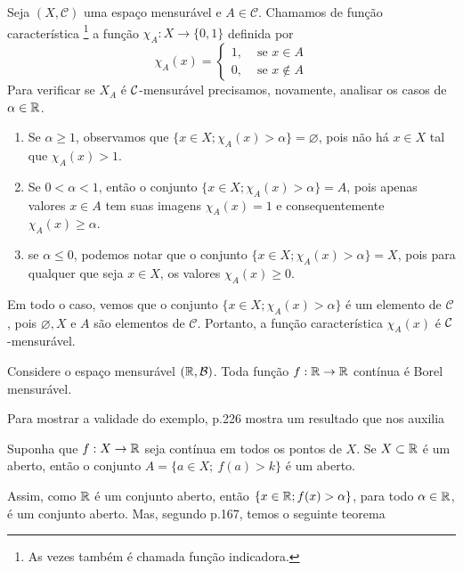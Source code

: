 \begin{example}
    Seja $(X, \mathcal{C})$ uma espaço mensurável e $A \in \mathcal{C}$.
    Chamamos de função característica \footnote{As vezes também é chamada  função indicadora.}
    a função $\chi_A: X \to \{0,1\}$ definida por 
    $$\chi_A(x) =\left\{\begin{array}{cc}
         1, & \textrm{\ se \ } x \in A \\
         0, & \textrm{\ se \ } x \notin A
    \end{array}\right.
    $$
	Para verificar se $X_A$ é $\operatorname{\mathcal{C}}$-mensurável precisamos, novamente, analisar os casos de $\alpha \in \mathbb{R}$.
	\begin{enumerate}[label*= (\Roman*)]
		\item Se $\alpha \geq 1$, observamos que $\{x \in X; \chi_A(x)>  \alpha\} = \varnothing$, pois não há $x \in X$ tal que $\chi_A(x) > 1$.  
		\item Se $ 0 <\alpha < 1$, então o conjunto $\{x \in X; \chi_A(x)>  \alpha\} = A$, pois apenas valores $x \in A$ tem suas imagens $\chi_A(x) = 1$ e consequentemente $\chi_A(x) \geq \alpha$.
		\item  se $\alpha \leq 0$, podemos notar que o conjunto $\{x \in X; \chi_A(x)>  \alpha\} = X$, pois para qualquer que seja $x \in X$, os valores $\chi_A(x) \geq 0$.
	\end{enumerate}
	Em todo o caso, vemos que o conjunto $\{x \in X; \chi_A(x)>  \alpha\}$ é um elemento de $\mathcal{C}$, pois $\varnothing, X$ e $A$ são elementos de $\mathcal{C}$. Portanto, a função característica $\chi_A(x)$ é $\operatorname{\mathcal{C}}$-mensurável.
\end{example}

\begin{example}
\label{ex:função-continua-mensuravel}
    Considere o espaço mensurável $(\mathbb{R}, \operatorname{\mathcal{B}})$. Toda função $f: \mathbb{R} \to \mathbb{R}$ contínua é Borel mensurável.
\end{example}
	Para mostrar a validade do exemplo, \supercite{elon}{p.226} mostra um resultado que nos auxilia
\begin{proposition}
\label{cit:função-continua-mensuravel}
	Suponha que $f:X \to \mathbb{R}$ seja contínua em todos os pontos de $X$.
	Se $X \subset \mathbb{R}$ é um aberto, então o conjunto $A = \{a \in X;\ f(a)>k\}$ é um aberto. 
\end{proposition}

	Assim, como $\mathbb{R}$ é um conjunto aberto, então $\{x \in \mathbb{R}; f(x) > \alpha\}$, para todo $\alpha \in \mathbb{R}$, é um conjunto aberto.
	Mas, segundo \supercite{elon}{p.167}, temos o seguinte teorema
	
